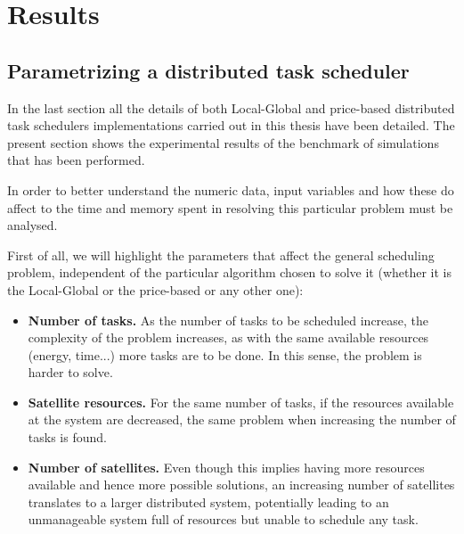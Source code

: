 
\chapter{Results} %

\label{Chapter4} %


\section{Parametrizing a distributed task scheduler}

In the last section all the details of both Local-Global and price-based distributed task schedulers implementations carried out in this thesis have been detailed. The present section shows the experimental results of the benchmark of simulations that has been performed.

In order to better understand the numeric data, input variables and how these do affect to the time and memory spent in resolving this particular problem must be analysed.

First of all, we will highlight the parameters that affect the general scheduling problem, independent of the particular algorithm chosen to solve it (whether it is the Local-Global or the price-based or any other one):

\begin{itemize}
\item \textbf{Number of tasks.} As the number of tasks to be scheduled increase, the complexity of the problem increases, as with the same available resources (energy, time...) more tasks are to be done. In this sense, the problem is harder to solve.

\item \textbf{Satellite resources.} For the same number of tasks, if the resources available at the system are decreased, the same problem when increasing the number of tasks is found.

\item \textbf{Number of satellites.} Even though this implies having more resources available and hence more possible solutions, an increasing number of satellites translates to a larger distributed system, potentially leading to an unmanageable system full of resources but unable to schedule any task.
\end{itemize}

